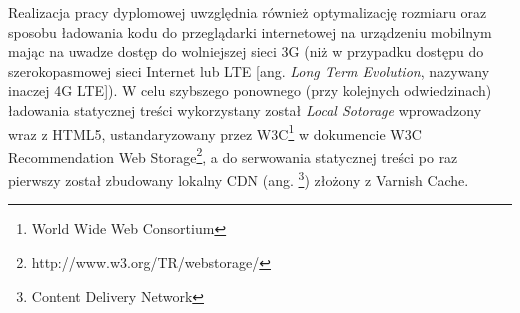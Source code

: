 Realizacja pracy dyplomowej uwzględnia również optymalizację rozmiaru oraz sposobu ładowania kodu do przeglądarki internetowej na urządzeniu mobilnym mając na uwadze dostęp do wolniejszej sieci 3G (niż w przypadku dostępu do szerokopasmowej sieci Internet lub LTE [ang. \emph{ Long Term Evolution}, nazywany inaczej 4G LTE]). W celu szybszego ponownego (przy kolejnych odwiedzinach) ładowania statycznej treści wykorzystany został \emph{Local Sotorage} wprowadzony wraz z HTML5, ustandaryzowany przez W3C\footnote{World Wide Web Consortium} w dokumencie W3C Recommendation Web Storage\footnote{http://www.w3.org/TR/webstorage/}, a do serwowania statycznej treści po raz pierwszy został zbudowany lokalny CDN (ang. \footnote{Content Delivery Network}) złożony z Varnish Cache.
